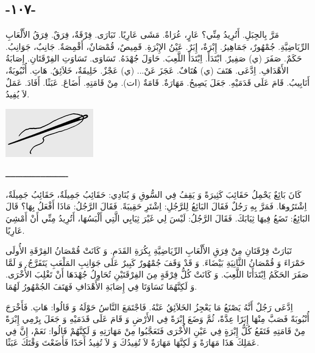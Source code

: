 \documentclass[a5paper]{article}
\begin{document}
\subsection{-١٠٧-}
مَرَّ بِالجِبَلِ. أَتُرِيدُ مِنِّي؟ عَارٍ، عُرَاةٌ. مَشَى عَارِيًا. تَبَارَى. فِرْقَةٌ، فِرَقٌ. فِرَقُ الأَلْعَابِ الرِّيَاضِيَّةِ. جُمْهُورٌ، جَمَاهِيرُ. إِبْرَةٌ، إِبَرٌ.\newline
عَيْنُ الإِبْرَةِ. قَمِيصٌ، قُمْصَانٌ، أَقْمِصَةٌ. جَانِبٌ، جَوَانِبُ. حَكَمٌ. صَفَرَ (ي) صَفِيرٌ. ابْتَدَأَ. اِبْتَدَأَ اللَّعِبَ. حَاوَلَ جُهْدَهُ. تَسَاوَى. تَسَاوَتِ الفِرْقَتَانِ. إِصَابَةُ الأَهْدَافِ. اِدَّعَى. هَتَفَ (ي) هُتَافٌ. عَجَزَ عَنْ... (ي) عَجْزٌ. خَلِيقَةٌ، خَلاَئِقُ. هَاتِ. أُنْبُوبَةٌ، أَنَابِيبُ. قَامَ عَلَى قَدَمَيْهِ. جَعَلَ يَصِيحُ. مَهَارَةٌ. قَامَةٌ (ات). مِنْ قَامَتِهِ. أَضَاعَ. عَبَثًا. أَفَادَ. عَمَلٌ لاَ يُفِيدُ.

\begin{center}
\includegraphics[width=1.5in,height=0.8209in]{images/MuhammadBagauddinprettified-img280.png}
\end{center}
ـــــــــــــــــــــــــ

كَانَ بَائِعٌ يَحْمِلُ حَقَائِبَ كَثِيرَةً وَ يَقِفُ فِي السُّوقِ وَ يُنَادِي: حَقَائِبُ جَمِيلَةٌ، حَقَائِبُ جَمِيلَةٌ، اِشْتَرُوهَا. فَمَرَّ بِهِ رَجُلٌ فَقَالَ البَائِعُ لِلرَّجُلِ: اِشْتَرِ حَقِيبَةً. فَقَالَ الرَّجُلُ: مَاذَا أَفْعَلُ بِهَا؟ قَالَ البَائِعُ: تَضَعُ فِيهَا ثِيَابَكَ. فَقَالَ الرَّجُلُ: لَيْسَ لِي غَيْرَ ثِيَابِي الَّتِي أَلْبَسُهَا، أَتُرِيدُ مِنِّي أَنْ أَمْشِيَ عَارِيًا. 

تَبَارَتْ فِرْقَتَانِ مِنْ فِرَقِ الأَلْعَابِ الرِّيَاضِيَّةِ بِكُرَةِ القَدَمِ. وَ كَانَتْ قُمْصَانُ الفِرْقَةِ الأُولَى حَمْرَاءَ وَ قُمْصَانُ الثَّانِيَةِ بَيْضَاءَ. وَ قَدْ وَقَفَ جُمْهُورٌ كَبِيرٌ عَلَى جَوَانِبِ المَلْعَبِ يَتَفَرَّجُ. وَ لَمَّا صَفَرَ الحَكَمُ اِبْتَدَأَتَا اللَّعِبَ. وَ كَانَتْ كُلُّ فِرْقَةٍ مِنَ الفِرْقَتَيْنِ تُحَاوِلُ جُهْدَهَا أَنْ تَغْلِبَ الأُخْرَى. وَ لَكِنَّهُمَا تَسَاوَتَا فِي إِصَابَةِ الأَهْدَافِ فَهَتَفَ الجُمْهُورُ لَهُمَا.

اِدَّعَى رَجُلٌ أَنَّهُ يَصْنَعُ مَا يَعْجِزُ الخَلاَئِقُ عَنْهُ. فَاجْتَمَعَ النَّاسُ حَوْلَهُ وَ قَالُوا: هَاتِ. فَأَخْرَجَ أُنْبُوبَةً فَصَبَّ مِنْهَا إِبَرًا عِدَّةً، ثُمَّ وَضَعَ إِبْرَةً فِي الأَرْضِ وَ قَامَ عَلَى قَدَمَيْهِ وَ جَعَلَ يِرْمِي إِبْرَةً مِنْ قَامَتِهِ فَتَقَعُ كُلُّ إِبْرَةٍ فِي عَيْنِ الأُخْرَى فَتَعَجَّبُوا مِنْ مَهَارَتِهِ وَ لَكِنَّهُمْ قَالُوا: نَعَمْ، إِنَّ فِي عَمَلِكَ هَذَا مَهَارَةً وَ لَكِنَّهَا مَهَارَةٌ لاَ تُفِيدُكَ وَ لاَ تُفِيدُ أَحَدًا فَأَضَعْتَ وَقْتَكَ عَبَثًا.
\end{document}
